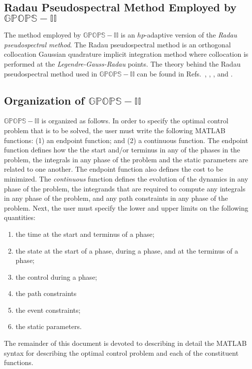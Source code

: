 \documentclass[10pt]{article}
\begin{document}
\subsection{Radau Pseudospectral Method Employed by $\mathbb{GPOPS-II}$}

The method employed by $\mathbb{GPOPS-II}$ is an $hp$-adaptive version of
the {\em Radau pseudospectral method}.  The Radau pseudospectral
method is an orthogonal collocation Gaussian quadrature implicit
integration method where  collocation is performed at the {\em
  Legendre-Gauss-Radau} points. The theory behind the Radau
pseudospectral method used in $\mathbb{GPOPS-II}$ can be found in 
Refs.~, , , and
.   

\subsection{Organization of $\mathbb{GPOPS-II}$}

$\mathbb{GPOPS-II}$ is organized as follows.  In order to specify the
optimal control problem that is to be solved, the user must write
the following MATLAB functions: (1) an endpoint function; and (2) a
continuous function.  The endpoint function defines how the the start and/or
terminus in any of the phases in the problem, the integrals in any
phase of the problem and the static parameters are related to one
another.  The endpoint function also defines the cost to be minimized.
The {\em continuous} function defines the evolution of the dynamics in
any phase of the problem, the integrands that are required to compute
any integrals in any phase of the problem, and any path constraints in
any phase of the problem.  Next, the user must specify the lower and
upper limits on the following quantities: 
\begin{enumerate}[(1)]
  \item the time at the start and terminus of a phase; 
  \item the state at the start of a phase, during a phase, and at the
    terminus of a phase;
 \item the control during a phase;
  \item the path constraints
 \item the event constraints;
  \item the static parameters.  
\end{enumerate}
The remainder of this document is devoted to describing in detail the
MATLAB syntax for describing the optimal control problem and each of
the constituent functions. 
\end{document}

